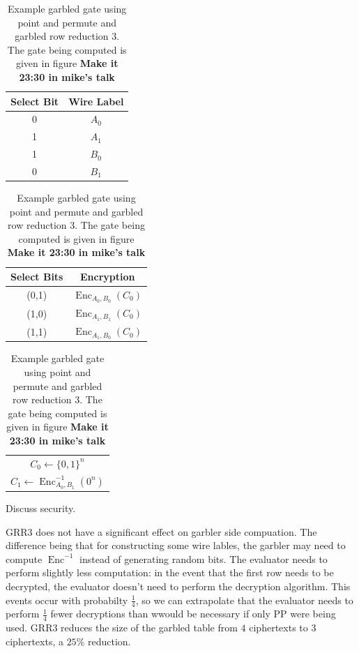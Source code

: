 \documentclass[12pt,twoside]{reedthesis}
\newcommand{\Enc}{\operatorname{Enc}}
\begin{document}
\begin{table}[h]
    \centering
    \begin{tabular}{|c|c|}
    \hline
    Select Bit & Wire Label \\
    \hline
    0 & $A_0$ \\
    1 & $A_1$ \\
    1 & $B_0$ \\
    0 & $B_1$ \\
    \hline
    \end{tabular}
    \qquad
    \begin{tabular}{|c|c|}
    \hline
    Select Bits & Encryption \\
    \hline
    (0,1) & $\Enc_{A_0, B_0}(C_0)$ \\
    (1,0) & $\Enc_{A_1, B_1}(C_0)$ \\
    (1,1) & $\Enc_{A_1, B_0}(C_0)$ \\
    \hline
    \end{tabular}
    \qquad
    \begin{tabular}{|c|}
    \hline
    $C_0 \gets \{0,1\}^n$ \\
    $C_1 \gets \Enc_{A_0, B_1}^{-1}(0^n)$ \\
    \hline
    \end{tabular}
    \caption{Example garbled gate using point and permute and garbled row reduction 3. The gate being computed is given in figure \textbf{Make it 23:30 in mike's talk}}
\end{table}

Discuss security.

GRR3 does not have a significant effect on garbler side compuation.
The difference being that for constructing some wire lables, the garbler may need to compute $\Enc^{-1}$ instead of generating random bits. 
The evaluator needs to perform slightly less computation: in the event that the first row needs to be decrypted, the evaluator doesn't need to perform the decryption algorithm. 
This events occur with probabilty $\frac{1}{4}$, so we can extrapolate that the evaluator needs to perform $\frac{1}{4}$ fewer decryptions than wwould be necessary if only PP were being used.
GRR3 reduces the size of the garbled table from $4$ ciphertexts to $3$ ciphertexts, a $25\%$ reduction.
\end{document}
